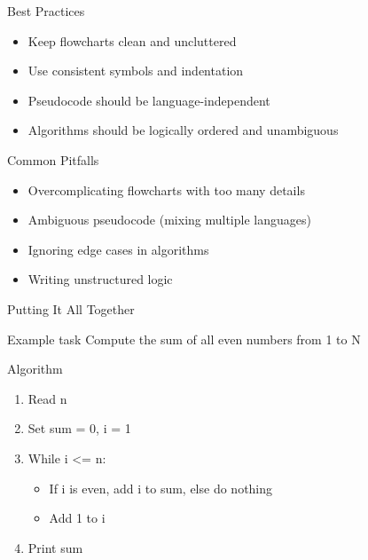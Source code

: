 \documentclass[12pt, aspectratio=169]{beamer}
\begin{document}
    \begin{frame}{Best Practices}
    \begin{itemize}
        \item Keep flowcharts clean and uncluttered
        \item Use consistent symbols and indentation
        \item Pseudocode should be language-independent
        \item Algorithms should be logically ordered and unambiguous
    \end{itemize}
    \end{frame}
    

    \begin{frame}{Common Pitfalls}
    \begin{itemize}
        \item Overcomplicating flowcharts with too many details
        \item Ambiguous pseudocode (mixing multiple languages)
        \item Ignoring edge cases in algorithms
        \item Writing unstructured logic
    \end{itemize}
    \end{frame}
    

    \begin{frame}{Putting It All Together}
    \begin{block}{Example task}
    Compute the sum of all even numbers from 1 to N
    \end{block}
    \end{frame}


    \begin{frame}{Algorithm}
    \begin{enumerate}
        \item Read n
        \item Set sum = 0, i = 1
        \item While i <= n:
            \begin{itemize}
                \item If i is even, add i to sum, else do nothing
                \item Add 1 to i
            \end{itemize}
        \item Print sum
    \end{enumerate}
    \end{frame}
\end{document}
